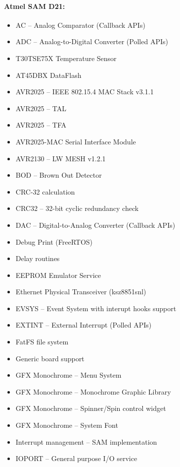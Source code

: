\paragraph{Atmel SAM D21:} \cite{AtmelSAMd20API}
\begin{multicols}{2}
	\begin{flushleft}
		\begin{itemize}
			\setlength\itemsep{1pt}
			\item AC -- Analog Comparator (Callback \ac{API}s)
			\item ADC -- Analog-to-Digital Converter (Polled \ac{API}s)
			\item T30TSE75X Temperature Sensor
			\item AT45DBX DataFlash
			\item AVR2025 -- IEEE 802.15.4 MAC Stack v3.1.1
			\item AVR2025 -- TAL
			\item AVR2025 -- TFA
			\item AVR2025-MAC Serial Interface Module
			\item AVR2130 -- LW MESH v1.2.1
			\item BOD -- Brown Out Detector
			\item CRC-32 calculation
			\item CRC32 -- 32-bit cyclic redundancy check
			\item DAC -- Digital-to-Analog Converter (Callback \ac{API}s)
			\item Debug Print (FreeRTOS)
			\item Delay routines
			\item EEPROM Emulator Service
			\item Ethernet Physical Transceiver (ksz8851snl)
			\item EVSYS -- Event System with interupt hooks support
			\item EXTINT -- External Interrupt (Polled \ac{API}s)
			\item FatFS file system
			\item Generic board support
			\item GFX Monochrome -- Menu System
			\item GFX Monochrome -- Monochrome Graphic Library
			\item GFX Monochrome -- Spinner/Spin control widget
			\item GFX Monochrome -- System Font
			\item Interrupt management -- SAM implementation
			\item IOPORT -- General purpose I/O service

\end{itemize}
\end{flushleft}
\end{multicols}
